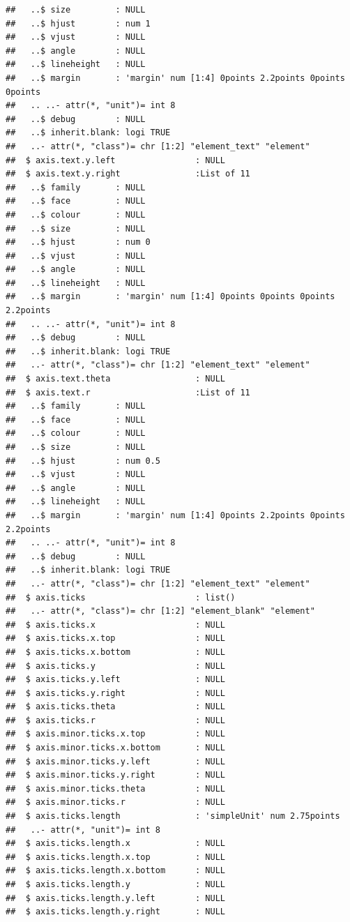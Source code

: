 \documentclass[
  12pt,
]{article}
\begin{document}
\begin{verbatim}
##   ..$ size         : NULL
##   ..$ hjust        : num 1
##   ..$ vjust        : NULL
##   ..$ angle        : NULL
##   ..$ lineheight   : NULL
##   ..$ margin       : 'margin' num [1:4] 0points 2.2points 0points 0points
##   .. ..- attr(*, "unit")= int 8
##   ..$ debug        : NULL
##   ..$ inherit.blank: logi TRUE
##   ..- attr(*, "class")= chr [1:2] "element_text" "element"
##  $ axis.text.y.left                : NULL
##  $ axis.text.y.right               :List of 11
##   ..$ family       : NULL
##   ..$ face         : NULL
##   ..$ colour       : NULL
##   ..$ size         : NULL
##   ..$ hjust        : num 0
##   ..$ vjust        : NULL
##   ..$ angle        : NULL
##   ..$ lineheight   : NULL
##   ..$ margin       : 'margin' num [1:4] 0points 0points 0points 2.2points
##   .. ..- attr(*, "unit")= int 8
##   ..$ debug        : NULL
##   ..$ inherit.blank: logi TRUE
##   ..- attr(*, "class")= chr [1:2] "element_text" "element"
##  $ axis.text.theta                 : NULL
##  $ axis.text.r                     :List of 11
##   ..$ family       : NULL
##   ..$ face         : NULL
##   ..$ colour       : NULL
##   ..$ size         : NULL
##   ..$ hjust        : num 0.5
##   ..$ vjust        : NULL
##   ..$ angle        : NULL
##   ..$ lineheight   : NULL
##   ..$ margin       : 'margin' num [1:4] 0points 2.2points 0points 2.2points
##   .. ..- attr(*, "unit")= int 8
##   ..$ debug        : NULL
##   ..$ inherit.blank: logi TRUE
##   ..- attr(*, "class")= chr [1:2] "element_text" "element"
##  $ axis.ticks                      : list()
##   ..- attr(*, "class")= chr [1:2] "element_blank" "element"
##  $ axis.ticks.x                    : NULL
##  $ axis.ticks.x.top                : NULL
##  $ axis.ticks.x.bottom             : NULL
##  $ axis.ticks.y                    : NULL
##  $ axis.ticks.y.left               : NULL
##  $ axis.ticks.y.right              : NULL
##  $ axis.ticks.theta                : NULL
##  $ axis.ticks.r                    : NULL
##  $ axis.minor.ticks.x.top          : NULL
##  $ axis.minor.ticks.x.bottom       : NULL
##  $ axis.minor.ticks.y.left         : NULL
##  $ axis.minor.ticks.y.right        : NULL
##  $ axis.minor.ticks.theta          : NULL
##  $ axis.minor.ticks.r              : NULL
##  $ axis.ticks.length               : 'simpleUnit' num 2.75points
##   ..- attr(*, "unit")= int 8
##  $ axis.ticks.length.x             : NULL
##  $ axis.ticks.length.x.top         : NULL
##  $ axis.ticks.length.x.bottom      : NULL
##  $ axis.ticks.length.y             : NULL
##  $ axis.ticks.length.y.left        : NULL
##  $ axis.ticks.length.y.right       : NULL

\end{verbatim}
\end{document}
